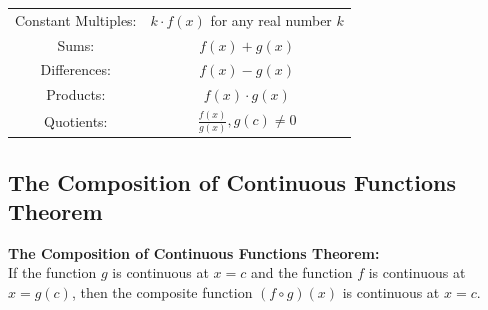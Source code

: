         \begin{tabular}{cc}
            Constant Multiples: & $k\cdot f(x)$ for any real number $k$ \\
            Sums: & $f(x)+g(x)$ \\
            Differences: & $f(x)-g(x)$ \\
            Products: & $f(x)\cdot g(x)$ \\
            Quotients: & $\frac{f(x)}{g(x)}, g(c)\not=0$
        \end{tabular}



    \subsection{The Composition of Continuous Functions Theorem}
        \color{purple} \textbf{The Composition of Continuous Functions Theorem:} \color{black} \\
        If the function $g$ is continuous at $x=c$ and the function $f$ is continuous at $x=g(c)$,
        then the composite function $(f\circ g)(x)$ is continuous at $x=c$.